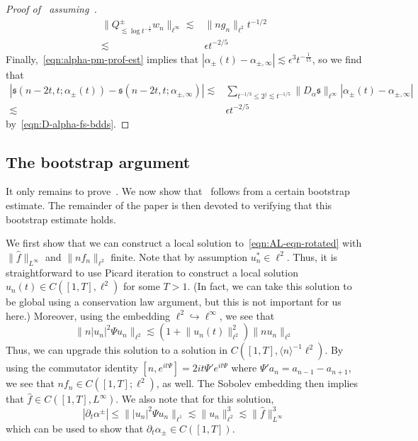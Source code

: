 \documentclass[letterpaper, reqno,final]{amsart}
\newcommand{\jBra}[1]{\langle #1 \rangle}
\newcommand{\fs}{\mathfrak{s}}
\begin{document}
\begin{proof}[Proof of~ assuming~]
    \begin{equation*}\begin{split}
        \lVert Q_{\lesssim \log t^{-\frac{1}{5}}}^\pm w_n \rVert_{\ell^\infty} \lesssim& \lVert n g_n \rVert_{\ell^2} t^{-1/2}\\
        \lesssim& \epsilon t^{-2/5}
    \end{split}\end{equation*}
    Finally,~\eqref{eqn:alpha-pm-prof-est} implies that $|\alpha_\pm(t) - \alpha_{\pm,\infty}| \lesssim \epsilon^3 t^{-\frac{1}{15}}$, so we find that
    \begin{equation*}\begin{split}
        |\fs(n - 2t, t; \alpha_{\pm}(t)) - \fs(n - 2t, t; \alpha_{\pm,\infty})| \lesssim& \sum_{t^{-1/3} \leq 2^j \lesssim t^{-1/5}} \lVert D_\alpha \fs \rVert_{\ell^\infty} |\alpha_\pm(t) - \alpha_{\pm,\infty}|\\
        \lesssim& \epsilon t^{-2/5}
    \end{split}
    \end{equation*}
    by~\eqref{eqn:D-alpha-fs-bdds}.
\end{proof}

\subsection{The bootstrap argument}

It only remains to prove~.  We now show that~ follows from a certain bootstrap estimate.  The remainder of the paper is then devoted to verifying that this bootstrap estimate holds.

We first show that we can construct a local solution to~\eqref{eqn:AL-eqn-rotated} with $\lVert \hat{f} \rVert_{L^\infty}$ and $\lVert n f_n \rVert_{\ell^2}$ finite.  Note that by assumption $u_n^* \in \ell^2$.  Thus, it is straightforward to use Picard iteration to construct a local solution $u_n(t) \in C([1,T],\ell^2)$ for some $T > 1$.  (In fact, we can take this solution to be global using a conservation law argument, but this is not important for us here.)  Moreover, using the embedding $\ell^2 \hookrightarrow \ell^\infty$, we see that
\begin{equation*}
    \lVert n |u_n|^2 \Psi u_n \rVert_{\ell^2}  \lesssim (1 + \lVert u_n(t) \rVert_{\ell^2}^2) \lVert n u_n \rVert_{\ell^2}
\end{equation*}
Thus, we can upgrade this solution to a solution in $C([1,T], \jBra{n}^{-1} \ell^2)$.  By using the commutator identity $[n, e^{it\Psi}] = 2it \Psi'e^{it\Psi}$ where $\Psi' a_n= a_{n-1} - a_{n+1}$, we see that $n f_n \in C([1,T];\ell^2)$, as well.  The Sobolev embedding then implies that $\hat{f} \in C([1,T], L^\infty)$.   We also note that for this solution, 
\begin{equation*}
    |\partial_t \alpha^{\pm}| \leq \lVert |u_n|^2 \Psi u_n \rVert_{\ell^1} \lesssim \lVert u_n \rVert_{\ell^2}^3 \lesssim \lVert \hat{f} \rVert_{L^\infty}^3
\end{equation*}
which can be used to show that $\partial_t \alpha_\pm \in C([1,T])$.
\end{document}
